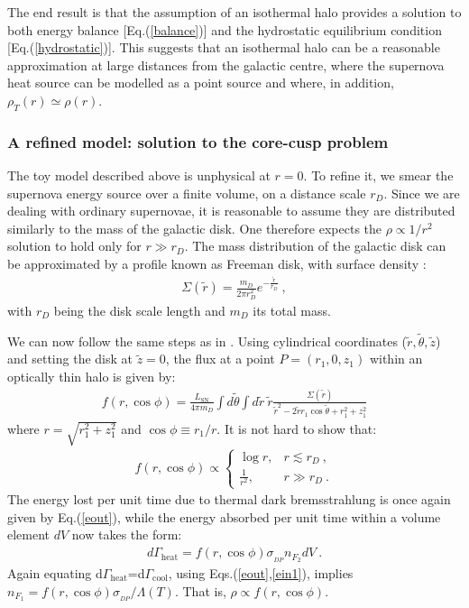 \documentclass[12pt]{article}
\begin{document}
{{The end result is that the assumption of an isothermal halo provides a
solution to both energy balance [Eq.(\ref{balance})] and the hydrostatic
equilibrium condition [Eq.(\ref{hydrostatic})]. This suggests that an
isothermal halo can be a reasonable approximation at large distances
from the galactic centre, where the supernova heat source can be
modelled as a point source and where, in addition, $\rho _T (r) \simeq
\rho (r)$.

\subsubsection{A refined model: solution to the core-cusp problem}

The toy model described above is unphysical at $r = 0$. To refine it, we
smear the supernova energy source over a finite volume, on a distance
scale $r_D$. Since we are dealing with ordinary supernovae, it is
reasonable to assume they are distributed similarly to the mass of the
galactic disk. One therefore expects the $\rho \propto 1/r ^2$ solution
to hold only for $r \gg r _D$. The mass distribution of the galactic
disk can be approximated by a profile known as Freeman disk, with
surface density \cite{freeman}:
%
\begin{eqnarray}
\Sigma (\widetilde{r}) = \frac{m _D}{2\pi r_D ^2}e
^{-\frac{\widetilde{r}}{r_D}} \ ,
\end{eqnarray}
%
with $r_D$ being the disk scale length and $m _D$ its total mass. 

We can now follow the same steps as in \cite{review}. Using cylindrical
coordinates ($\widetilde{r},\widetilde{\theta},\widetilde{z}$) and
setting the disk at $\widetilde{z} = 0$, the flux at a point $P = (r
_1,0,z _1)$ within an optically thin halo is given by:
%
\begin{eqnarray}
f(r,\cos \phi ) = \frac{L _{\text{SN}}}{4\pi m _D} \int
d\widetilde{\theta} \int d\widetilde{r} \ \widetilde{r} \frac{\Sigma
(\widetilde{r})}{{\widetilde{r}} ^2 - 2\widetilde{r}r _1 \cos
\widetilde{\theta} + r _1 ^2 + z _1 ^2}
\end{eqnarray}
%
where $r = \sqrt{r _1 ^2 + z _1 ^2}$ and $\cos \phi \equiv r _1/r$. It
is not hard to show that:
%
\begin{eqnarray}
f(r,\cos \phi) \propto \begin{cases}
                  \log r, & r \lesssim r_D \ , \\
                  \frac{1}{r ^2}, & r \gg r_D \ .
                  \end{cases}
\label{frc}
\end{eqnarray}
%
The energy lost per unit time due to thermal dark bremsstrahlung is once
again given by Eq.(\ref{eout}), while the energy absorbed per unit time
within a volume element $dV$ now takes the form:
%
\begin{eqnarray}
d\Gamma _{\text{heat}} = f(r,\cos \phi)\sigma _{_{DP}}n _{F _2}dV \ .
\label{ein1}
\end{eqnarray}
%
Again equating d$\Gamma _{\text{heat}}$=d$\Gamma _{\text{cool}}$, using
Eqs.(\ref{eout},\ref{ein1}), implies $n _{F_1} = f(r,\cos \phi)\sigma
_{_{DP}}/\Lambda (T)$. That is, $\rho \propto f(r,\cos \phi )$. 


}}
\end{document}
